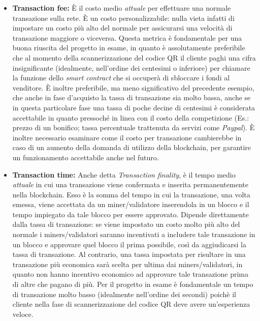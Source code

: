 \documentclass[a4paper, 12pt]{article}
\begin{document}
\begin{itemize}
\item \textbf{Transaction fee: }
È il costo medio \textit{attuale} per effettuare una normale transazione sulla rete.
È un costo personalizzabile: nulla vieta infatti di impostare un costo più alto del normale per assicurarsi una velocità di transazione maggiore o viceversa.
Questa metrica è fondamentale per una buona riuscita del progetto in esame, in quanto è assolutamente preferibile che al momento della scannerizzazione del codice QR
il cliente paghi una cifra insignificante (idealmente, nell'ordine dei centesimi o inferiore) per chiamare la funzione dello \textit{smart contract} che si occuperà di sbloccare i fondi
al venditore. È inoltre preferibile, ma meno significativo del precedente esempio, che anche in fase d'acquisto la tassa di transazione sia molto bassa, anche se
in questa particolare fase una tassa di poche decine di centesimi è considerata accettabile in quanto pressoché in linea con il costo della competizione (Es.: prezzo di un bonifico;
tassa percentuale trattenuta da servizi come \textit{Paypal}).
È inoltre necessario esaminare come il costo per transazione cambierebbe in caso di un aumento della domanda di utilizzo della blockchain, per garantire un funzionamento
accettabile anche nel futuro.

\item \textbf{Transaction time: }
Anche detta \textit{Transaction finality}, è il tempo medio \textit{attuale} in cui una transazione viene confermata e inserita permanentemente nella blockchain.
Esso è la somma del tempo in cui la transazione, una volta emessa, viene accettata da un miner/validatore inserendola in un blocco e il tempo impiegato da tale blocco per essere
approvato. Dipende direttamente dalla tassa di transazione: se viene impostato un costo molto più alto del normale i miners/validatori saranno incentivati a includere tale transazione
in un blocco e approvare quel blocco il prima possibile, così da aggiudicarsi la tassa di transazione. Al contrario, una tassa impostata per risultare in una transazione più economica
sarà scelta per ultima dai miners/validatori, in quanto non hanno incentivo economico ad approvare tale transazione prima di altre che pagano di più.
Per il progetto in esame è fondamentale un tempo di transazione molto basso (idealmente nell'ordine dei secondi) poichè il cliente nella fase di scannerizzazione del codice QR deve
avere un'esperienza veloce.


\end{itemize}
\end{document}
